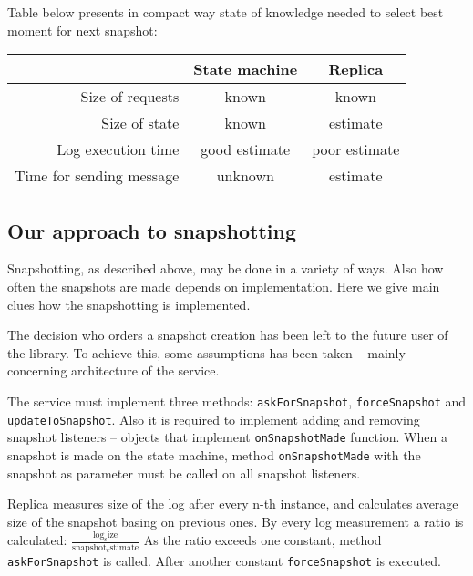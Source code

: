 Table below presents in compact way state of knowledge needed to select best moment for next snapshot:
\begin{center}
  \small
  \begin{tabular}{r|c|c|}
    \cline{2-3}
     & State machine & Replica \\ \hline 
    \multicolumn{1}{|r|}{Size of requests} & known & known \\ \hline
    \multicolumn{1}{|r|}{Size of state } & known & estimate \\ \hline
    \multicolumn{1}{|r|}{Log execution time} & good estimate & poor estimate \\ \hline
    \multicolumn{1}{|r|}{Time for sending message} & unknown & estimate \\ \hline
  \end{tabular}
\end{center}

\subsection{Our approach to snapshotting}
\label{subsec:Our_approach_to_snapshotting}
Snapshotting, as described above, may be done in a variety of ways. Also how often the snapshots are made depends on implementation. Here we give main clues how the snapshotting is implemented.

The decision who orders a snapshot creation has been left to the future user of the library. To achieve this, some assumptions has been taken -- mainly
concerning architecture of the service.

The service must implement three methods: \texttt{askForSnapshot}, \texttt{forceSnapshot} and \texttt{up\-date\-To\-Snap\-shot}. Also it is required to implement adding and removing snapshot listeners -- objects that implement \texttt{onSnapshotMade} function. When a snapshot is made on the state machine, method \texttt{onSnapshotMade} with the snapshot as parameter must be called on all snapshot listeners.

Replica measures size of the log after every n-th instance, and calculates average size of the snapshot basing on previous ones. By every log measurement a ratio is calculated: $\frac{ \mathrm{log_size} }{ \mathrm{snapshot_estimate} }$ As the ratio exceeds one constant, method \texttt{askForSnapshot} is called. After another constant \texttt{forceSnapshot} is executed.

